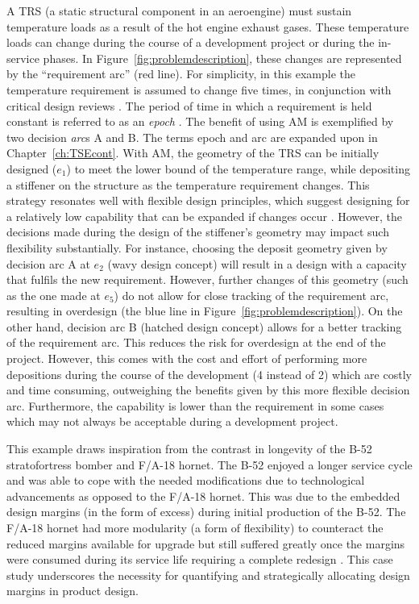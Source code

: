 A \acf{TRS} (a static structural component in an aeroengine) must sustain temperature loads as a result of the hot engine exhaust gases. These temperature loads can change during the course of a development project or during the in-service phases. In Figure~\ref{fig:problemdescription}, these changes are represented by the “requirement arc” (red line). For simplicity, in this example the temperature requirement is assumed to change five times, in conjunction with critical design reviews \cite{Cooper2008}. The period of time in which a requirement is held constant is referred to as an \textit{epoch} \cite{McManus2007}. The benefit of using \ac{AM} is exemplified by two decision \textit{arc}s A and B. The terms epoch and arc are expanded upon in Chapter~\ref{ch:TSEcont}. With \ac{AM}, the geometry of the \ac{TRS} can be initially designed ($e_1$) to meet the lower bound of the temperature range, while depositing a stiffener on the structure as the temperature requirement changes. This strategy resonates well with flexible design principles, which suggest designing for a relatively low capability that can be expanded if changes occur \cite{DeNeufville2011}. However, the decisions made during the design of the stiffener’s geometry may impact such flexibility substantially. For instance, choosing the deposit geometry given by decision arc A at $e_2$ (wavy design concept) will result in a design with a capacity that fulfils the new requirement. However, further changes of this geometry (such as the one made at $e_5$) do not allow for close tracking of the requirement arc, resulting in overdesign (the blue line in Figure~\ref{fig:problemdescription}). On the other hand, decision arc B (hatched design concept) allows for a better tracking of the requirement arc. This reduces the risk for overdesign at the end of the project. However, this comes with the cost and effort of performing more depositions during the course of the development (4 instead of 2) which are costly and time consuming, outweighing the benefits given by this more flexible decision arc. Furthermore, the capability is lower than the requirement in some cases which may not always be acceptable during a development project.

This example draws inspiration from the contrast in longevity of the B-52 stratofortress bomber and F/A-18 hornet. The B-52 enjoyed a longer service cycle and was able to cope with the needed modifications due to technological advancements as opposed to the F/A-18 hornet. This was due to the embedded design margins (in the form of excess) during initial production of the B-52. The F/A-18 hornet had more modularity (a form of flexibility) to counteract the reduced margins available for upgrade but still suffered greatly once the margins were consumed during its service life requiring a complete redesign \cite{Long2017}. This case study underscores the necessity for quantifying and strategically allocating design margins in product design.

